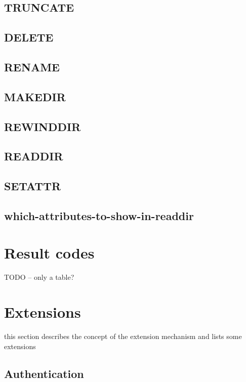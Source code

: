 \subsection{TRUNCATE}

\subsection{DELETE}

\subsection{RENAME}

\subsection{MAKEDIR}

\subsection{REWINDDIR}

\subsection{READDIR}

\subsection{SETATTR}

\subsection{which-attributes-to-show-in-readdir}


\section{Result codes}

TODO -- only a table?


\section{Extensions}

this section describes the concept of the extension mechanism and lists some extensions

\subsection{Authentication}

